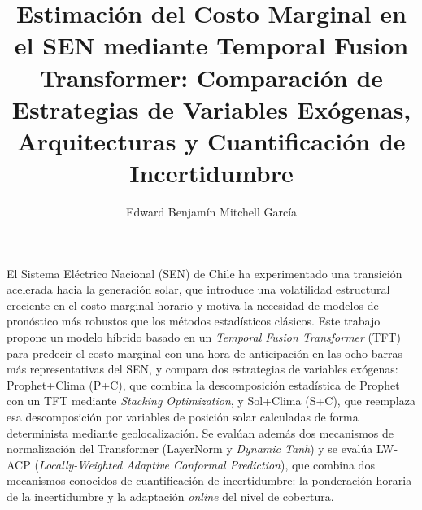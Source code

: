 \documentclass{umemoria}
\author{Edward Benjamín Mitchell García}
\title{Estimación del Costo Marginal en el SEN mediante Temporal Fusion Transformer: Comparación de Estrategias de Variables Exógenas, Arquitecturas y Cuantificación de Incertidumbre}
\begin{document}
\frontmatter
\maketitle

\begin{resumen}
El Sistema Eléctrico Nacional (SEN) de Chile ha experimentado una transición acelerada hacia la generación solar, que introduce una volatilidad estructural creciente en el costo marginal horario y motiva la necesidad de modelos de pronóstico más robustos que los métodos estadísticos clásicos. Este trabajo propone un modelo híbrido basado en un \textit{Temporal Fusion Transformer} (TFT) para predecir el costo marginal con una hora de anticipación en las ocho barras más representativas del SEN, y compara dos estrategias de variables exógenas: Prophet+Clima (P+C), que combina la descomposición estadística de Prophet con un TFT mediante \textit{Stacking Optimization}, y Sol+Clima (S+C), que reemplaza esa descomposición por variables de posición solar calculadas de forma determinista mediante geolocalización. Se evalúan además dos mecanismos de normalización del Transformer (LayerNorm y \textit{Dynamic Tanh}) y se evalúa LW-ACP (\textit{Locally-Weighted Adaptive Conformal Prediction}), que combina dos mecanismos conocidos de cuantificación de incertidumbre: la ponderación horaria de la incertidumbre y la adaptación \textit{online} del nivel de cobertura.


\end{resumen}
\end{document}
